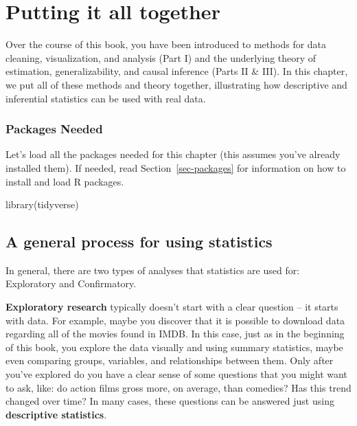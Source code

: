 \documentclass[
  letterpaper,
  DIV=11,
  numbers=noendperiod]{scrreprt}
\newenvironment{Shaded}{\begin{snugshade}}{\end{snugshade}}
\newcommand{\FunctionTok}[1]{\textcolor[rgb]{0.28,0.35,0.67}{#1}}
\newcommand{\NormalTok}[1]{\textcolor[rgb]{0.00,0.23,0.31}{#1}}
\theoremstyle{definition}
\theoremstyle{remark}
\begin{document}
\hypertarget{sec-putting-together}{%
\chapter{Putting it all together}\label{sec-putting-together}}

Over the course of this book, you have been introduced to methods for
data cleaning, visualization, and analysis (Part I) and the underlying
theory of estimation, generalizability, and causal inference (Parts II
\& III). In this chapter, we put all of these methods and theory
together, illustrating how descriptive and inferential statistics can be
used with real data.

\hypertarget{packages-needed-6}{%
\subsection*{Packages Needed}\label{packages-needed-6}}

Let's load all the packages needed for this chapter (this assumes you've
already installed them). If needed, read Section~\ref{sec-packages} for
information on how to install and load R packages.

\begin{Shaded}
\begin{Highlighting}[]
\FunctionTok{library}\NormalTok{(tidyverse)}
\end{Highlighting}
\end{Shaded}

\hypertarget{a-general-process-for-using-statistics}{%
\section{A general process for using
statistics}\label{a-general-process-for-using-statistics}}

In general, there are two types of analyses that statistics are used
for: Exploratory and Confirmatory.

\textbf{Exploratory research} typically doesn't start with a clear
question -- it starts with data. For example, maybe you discover that it
is possible to download data regarding all of the movies found in IMDB.
In this case, just as in the beginning of this book, you explore the
data visually and using summary statistics, maybe even comparing groups,
variables, and relationships between them. Only after you've explored do
you have a clear sense of some questions that you might want to ask,
like: do action films gross more, on average, than comedies? Has this
trend changed over time? In many cases, these questions can be answered
just using \textbf{descriptive statistics}.
\end{document}
